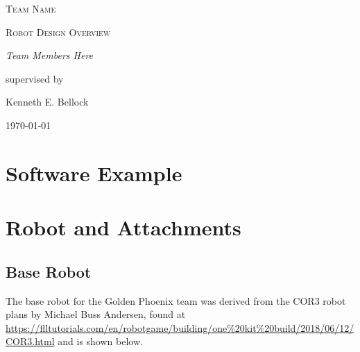 \documentclass[letter, article]{article}
\begin{document}
\begin{titlepage}
	\centering
	{\scshape\LARGE Team Name\par}
	\vspace{1cm}
	{\scshape\Large Robot Design Overview\par}
	\vspace{1.5cm}
	{\huge\bfseries \par}
	\vspace{2cm}
	{\Large\itshape Team Members Here\par}
	\vfill
	supervised by\par
	Kenneth E. Bellock

	\vfill

	{\large \today\par}
\end{titlepage}

\section{Software Example}

\begin{center}
\end{center}

\begin{center}
\end{center}

\section{Robot and Attachments}

\subsection{Base Robot}

The base robot for the Golden Phoenix team was derived from the COR3 robot plans by Michael Buss Andersen, found at \url{https://flltutorials.com/en/robotgame/building/one%20kit%20build/2018/06/12/COR3.html} and is shown below.
\end{document}
